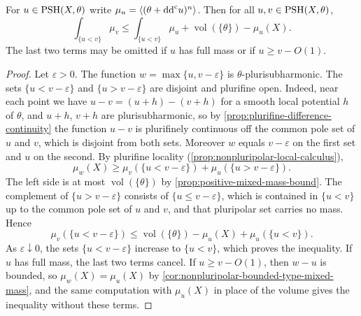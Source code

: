 \begin{proposition}\label{prop:global-nonpluripolar-comparison}
For $u\in\mathrm{PSH}(X,\theta)$ write $\mu_u=\langle(\theta+\mathrm{dd}^{\mathrm{c}} u)^n\rangle$. Then for all $u,v\in\mathrm{PSH}(X,\theta)$,
\[
 \int_{\{u<v\}}\mu_v
 \leq\int_{\{u<v\}}\mu_u+\operatorname{vol}(\{\theta\})-\mu_u(X).
\]
The last two terms may be omitted if $u$ has full mass or if $u\geq v-O(1)$.
\end{proposition}
\begin{proof}
Let $\varepsilon>0$. The function $w=\max\{u,v-\varepsilon\}$ is $\theta$-plurisubharmonic. The sets $\{u<v-\varepsilon\}$ and $\{u>v-\varepsilon\}$ are disjoint and plurifine open. Indeed, near each point we have $u-v=(u+h)-(v+h)$ for a smooth local potential $h$ of $\theta$, and $u+h$, $v+h$ are plurisubharmonic, so by \cref{prop:plurifine-difference-continuity} the function $u-v$ is plurifinely continuous off the common pole set of $u$ and $v$, which is disjoint from both sets. Moreover $w$ equals $v-\varepsilon$ on the first set and $u$ on the second. By plurifine locality (\cref{prop:nonpluripolar-local-calculus}),
\[
 \mu_w(X)\geq
 \mu_v(\{u<v-\varepsilon\})+\mu_u(\{u>v-\varepsilon\}).
\]
The left side is at most $\operatorname{vol}(\{\theta\})$ by \cref{prop:positive-mixed-mass-bound}. The complement of $\{u>v-\varepsilon\}$ consists of $\{u\leq v-\varepsilon\}$, which is contained in $\{u<v\}$ up to the common pole set of $u$ and $v$, and that pluripolar set carries no mass. Hence
\[
 \mu_v(\{u<v-\varepsilon\})\leq\operatorname{vol}(\{\theta\})-\mu_u(X)+\mu_u(\{u<v\}).
\]
As $\varepsilon\downarrow0$, the sets $\{u<v-\varepsilon\}$ increase to $\{u<v\}$, which proves the inequality. If $u$ has full mass, the last two terms cancel. If $u\geq v-O(1)$, then $w-u$ is bounded, so $\mu_w(X)=\mu_u(X)$ by \cref{cor:nonpluripolar-bounded-type-mixed-mass}, and the same computation with $\mu_u(X)$ in place of the volume gives the inequality without these terms.
\end{proof}

